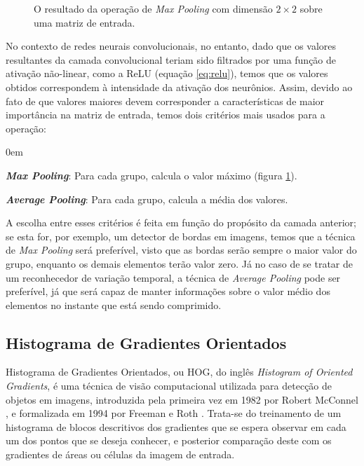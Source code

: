 \begin{figure}[ht]
    \centering
    
    \caption{O resultado da operação de \textit{Max Pooling} com dimensão $2\times2$ sobre uma matriz de entrada.}
    \label{fig:maxpool}
\end{figure}

No contexto de redes neurais convolucionais, no entanto, dado que os valores resultantes da camada convolucional teriam sido filtrados por uma função de ativação não-linear, como a ReLU (equação \ref{eq:relu}), temos que os valores obtidos correspondem à intensidade da ativação dos neurônios.
Assim, devido ao fato de que valores maiores devem corresponder a características de maior importância na matriz de entrada, temos dois critérios mais usados para a operação:

\begin{description}
    \itemsep0em 
    \item \textit{\textbf{Max Pooling}}: Para cada grupo, calcula o valor máximo (figura \ref{fig:maxpool}).
    \item \textit{\textbf{Average Pooling}}: Para cada grupo, calcula a média dos valores.
\end{description}

A escolha entre esses critérios é feita em função do propósito da camada anterior; se esta for, por exemplo, um detector de bordas em imagens, temos que a técnica de \textit{Max Pooling} será preferível, visto que as bordas serão sempre o maior valor do grupo, enquanto os demais elementos terão valor zero.
Já no caso de se tratar de um reconhecedor de variação temporal, a técnica de \textit{Average Pooling} pode ser preferível, já que será capaz de manter informações sobre o valor médio dos elementos no instante que está sendo comprimido.

\subsection{Histograma de Gradientes Orientados}
\label{sec:facialrecog}

Histograma de Gradientes Orientados, ou HOG, do inglês \textit{Histogram of Oriented Gradients}, é uma técnica de visão computacional utilizada para detecção de objetos em imagens, introduzida pela primeira vez em 1982 por Robert McConnel \cite{mcconnellMethodApparatusPattern1986}, e formalizada em 1994 por Freeman e Roth \cite{freemanOrientationHistogramsHand}.
Trata-se do treinamento de um histograma de blocos descritivos dos gradientes que se espera observar em cada um dos pontos que se deseja conhecer, e posterior comparação deste com os gradientes de áreas ou células da imagem de entrada.

